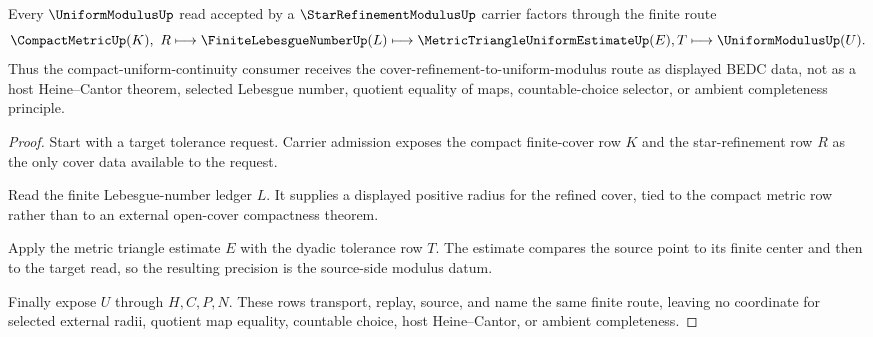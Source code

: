 \begin{theorem}\label{thm:star-refinement-modulus-cover-to-modulus-exactness}
Every $\UniformModulusUp$ read accepted by a $\StarRefinementModulusUp$ carrier factors through the finite route
$$
\CompactMetricUp(K),\ R \longmapsto \FiniteLebesgueNumberUp(L) \longmapsto \MetricTriangleUniformEstimateUp(E),T \longmapsto \UniformModulusUp(U).
$$
Thus the compact-uniform-continuity consumer receives the cover-refinement-to-uniform-modulus route as displayed BEDC data, not as a host Heine--Cantor theorem, selected Lebesgue number, quotient equality of maps, countable-choice selector, or ambient completeness principle.
\end{theorem}
\begin{proof}
Start with a target tolerance request. Carrier admission exposes the compact finite-cover row $K$ and the star-refinement row $R$ as the only cover data available to the request.

Read the finite Lebesgue-number ledger $L$. It supplies a displayed positive radius for the refined cover, tied to the compact metric row rather than to an external open-cover compactness theorem.

Apply the metric triangle estimate $E$ with the dyadic tolerance row $T$. The estimate compares the source point to its finite center and then to the target read, so the resulting precision is the source-side modulus datum.

Finally expose $U$ through $H,C,P,N$. These rows transport, replay, source, and name the same finite route, leaving no coordinate for selected external radii, quotient map equality, countable choice, host Heine--Cantor, or ambient completeness.
\end{proof}


\begin{closurestatus}{\StarRefinementModulusUp}
  \theoryclosure{\obligationClosure}
  \formalstatus{\unformalizedV}
\end{closurestatus}
